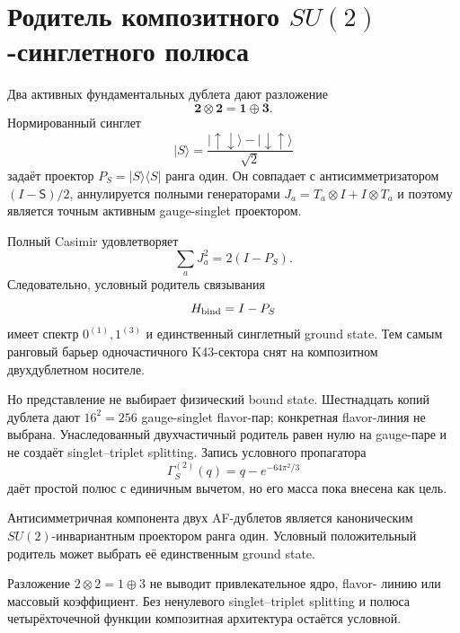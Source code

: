 \chapter{Родитель композитного
\texorpdfstring{$SU(2)$}{SU(2)}-синглетного полюса}
\label{ch:v10-discrete-resolution-su2-composite-singlet-pole}

Два активных фундаментальных дублета дают разложение
\begin{equation}
 \mathbf2\otimes\mathbf2=\mathbf1\oplus\mathbf3.
\end{equation}
Нормированный синглет
\begin{equation}
 |S\rangle=\frac{|\uparrow\downarrow\rangle-
 |\downarrow\uparrow\rangle}{\sqrt2}
\end{equation}
задаёт проектор $P_S=|S\rangle\langle S|$ ранга один. Он совпадает с
антисимметризатором $(I-\mathsf S)/2$, аннулируется полными генераторами
$J_a=T_a\otimes I+I\otimes T_a$ и поэтому является точным активным
gauge-singlet проектором.

Полный Casimir удовлетворяет
\begin{equation}
 \sum_aJ_a^2=2(I-P_S).
\end{equation}
Следовательно, условный родитель связывания
\begin{equation}
 H_{\rm bind}=I-P_S
\end{equation}
имеет спектр $0^{(1)},1^{(3)}$ и единственный синглетный ground state.
Тем самым ранговый барьер одночастичного K43-сектора снят на композитном
двухдублетном носителе.

Но представление не выбирает физический bound state. Шестнадцать копий
дублета дают $16^2=256$ gauge-singlet flavor-пар; конкретная flavor-линия
не выбрана. Унаследованный двухчастичный родитель равен нулю на gauge-паре
и не создаёт singlet--triplet splitting. Запись условного пропагатора
\begin{equation}
 \Gamma_S^{(2)}(q)=q-e^{-64\pi^2/3}
\end{equation}
даёт простой полюс с единичным вычетом, но его масса пока внесена как цель.

\begin{theorem}
Антисимметричная компонента двух AF-дублетов является каноническим
$SU(2)$-инвариантным проектором ранга один. Условный положительный родитель
может выбрать её единственным ground state.
\end{theorem}

\begin{nogocriterion}
Разложение $2\otimes2=1\oplus3$ не выводит привлекательное ядро, flavor-
линию или массовый коэффициент. Без ненулевого singlet--triplet splitting
и полюса четырёхточечной функции композитная архитектура остаётся условной.
\end{nogocriterion}

